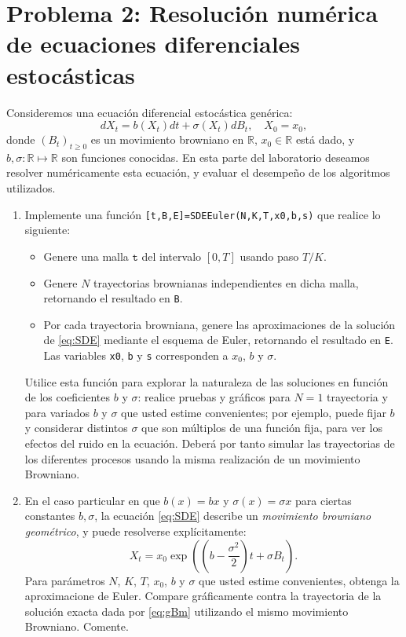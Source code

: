 \section*{Problema 2: Resolución numérica de ecuaciones diferenciales estocásticas} 
Consideremos una ecuación diferencial estocástica genérica:
\begin{equation}
\label{eq:SDE}
dX_t = b(X_t)dt + \sigma(X_t) dB_t, \quad X_0 = x_0,
\end{equation}
donde $(B_t)_{t\geq 0}$ es un movimiento browniano en $\mathbb{R}$, $x_0 \in \mathbb{R}$ está dado, y $b,\sigma: \mathbb{R} \mapsto \mathbb{R}$ son funciones conocidas. En esta parte del laboratorio deseamos resolver numéricamente esta ecuación, y evaluar el desempeño de los algoritmos utilizados.

\begin{enumerate}
\item Implemente una función \texttt{[t,B,E]=SDEEuler(N,K,T,x0,b,s)} que realice lo siguiente:
\begin{itemize}
\item Genere una malla $\texttt{t}$ del intervalo $[0,T]$ usando paso $T/K$.
\item Genere $N$ trayectorias brownianas independientes en dicha malla, retornando el resultado en \texttt{B}.
\item Por cada trayectoria browniana, genere las aproximaciones de la solución de \eqref{eq:SDE} mediante el esquema de Euler, retornando el resultado en \texttt{E}. Las variables \texttt{x0}, \texttt{b} y \texttt{s} corresponden a $x_0$, $b$ y $\sigma$.
\end{itemize}
Utilice esta función para explorar la naturaleza de las soluciones en función de los coeficientes $b$ y $\sigma$: realice pruebas y gráficos para $N=1$ trayectoria y para variados $b$ y $\sigma$ que usted estime convenientes; por ejemplo, puede fijar $b$ y considerar distintos $\sigma$ que son múltiplos de una función fija, para ver los efectos del ruido en la ecuación. Deber\'a  por tanto simular las trayectorias de los diferentes procesos usando la misma realizaci\'on de un movimiento  Browniano. 

\item En el caso particular en que $b(x) = bx$ y $\sigma(x) = \sigma x$ para ciertas constantes $b,\sigma$, la ecuación \eqref{eq:SDE} describe un \emph{movimiento browniano geométrico}, y puede resolverse explícitamente:
\begin{equation}
\label{eq:gBm}
X_t = x_0 \exp\left( (b-\frac{\sigma^2}{2}) t  +  \sigma B_t \right).
\end{equation}
Para parámetros $N$, $K$, $T$, $x_0$, $b$ y $\sigma$ que usted estime convenientes, obtenga la aproximacione de Euler. Compare gráficamente contra la trayectoria de la solución exacta dada por \eqref{eq:gBm} utilizando el mismo movimiento Browniano. Comente.


\end{enumerate}
